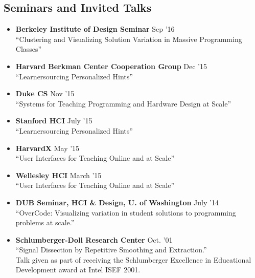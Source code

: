 \documentclass[margin]{res}
\begin{document}
\begin{resume}





\section{Seminars and Invited Talks}

\begin{itemize}[leftmargin=*] \itemsep -2pt
\item {\bf Berkeley Institute of Design Seminar} \hfill Sep '16 \\ ``Clustering and Visualizing Solution Variation in Massive Programming Classes''

\item {\bf Harvard Berkman Center Cooperation Group} \hfill Dec '15 \\ ``Learnersourcing Personalized Hints''

\item {\bf Duke CS} \hfill Nov '15 \\ ``Systems for Teaching Programming and Hardware Design at Scale''

\item {\bf Stanford HCI} \hfill July '15 \\ ``Learnersourcing Personalized Hints''

\item {\bf HarvardX}  \hfill May '15 \\``User Interfaces for Teaching Online and at Scale''

\item {\bf Wellesley HCI}  \hfill March '15 \\``User Interfaces for Teaching Online and at Scale''


\item {\bf DUB Seminar, HCI \& Design, U. of Washington} \hfill July '14 \\``OverCode: Visualizing variation in student solutions to programming problems at scale.''

\item {\bf Schlumberger-Doll Research Center} \hfill Oct. '01 \\``Signal Dissection by Repetitive Smoothing and Extraction.'' \\
Talk given as part of receiving the Schlumberger Excellence in Educational Development award at Intel ISEF 2001.
\end{itemize}





\end{resume}
\end{document}
